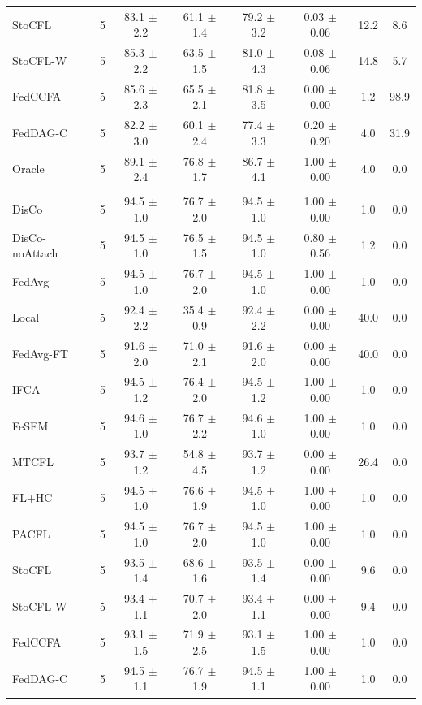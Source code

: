 {\begin{tabular}{l r c c c c c c}
StoCFL & 5 & 83.1 $\pm$ 2.2 & 61.1 $\pm$ 1.4 & 79.2 $\pm$ 3.2 & 0.03 $\pm$ 0.06 & 12.2 & 8.6 \\
StoCFL-W & 5 & 85.3 $\pm$ 2.2 & 63.5 $\pm$ 1.5 & 81.0 $\pm$ 4.3 & 0.08 $\pm$ 0.06 & 14.8 & 5.7 \\
FedCCFA & 5 & 85.6 $\pm$ 2.3 & 65.5 $\pm$ 2.1 & 81.8 $\pm$ 3.5 & 0.00 $\pm$ 0.00 & 1.2 & 98.9 \\
FedDAG-C & 5 & 82.2 $\pm$ 3.0 & 60.1 $\pm$ 2.4 & 77.4 $\pm$ 3.3 & 0.20 $\pm$ 0.20 & 4.0 & 31.9 \\
Oracle & 5 & 89.1 $\pm$ 2.4 & 76.8 $\pm$ 1.7 & 86.7 $\pm$ 4.1 & 1.00 $\pm$ 0.00 & 4.0 & 0.0 \\
\addlinespace
\multicolumn{8}{l}{\textit{Label skew only}} \\
DisCo & 5 & 94.5 $\pm$ 1.0 & 76.7 $\pm$ 2.0 & 94.5 $\pm$ 1.0 & 1.00 $\pm$ 0.00 & 1.0 & 0.0 \\
DisCo-noAttach & 5 & 94.5 $\pm$ 1.0 & 76.5 $\pm$ 1.5 & 94.5 $\pm$ 1.0 & 0.80 $\pm$ 0.56 & 1.2 & 0.0 \\
FedAvg & 5 & 94.5 $\pm$ 1.0 & 76.7 $\pm$ 2.0 & 94.5 $\pm$ 1.0 & 1.00 $\pm$ 0.00 & 1.0 & 0.0 \\
Local & 5 & 92.4 $\pm$ 2.2 & 35.4 $\pm$ 0.9 & 92.4 $\pm$ 2.2 & 0.00 $\pm$ 0.00 & 40.0 & 0.0 \\
FedAvg-FT & 5 & 91.6 $\pm$ 2.0 & 71.0 $\pm$ 2.1 & 91.6 $\pm$ 2.0 & 0.00 $\pm$ 0.00 & 40.0 & 0.0 \\
IFCA & 5 & 94.5 $\pm$ 1.2 & 76.4 $\pm$ 2.0 & 94.5 $\pm$ 1.2 & 1.00 $\pm$ 0.00 & 1.0 & 0.0 \\
FeSEM & 5 & 94.6 $\pm$ 1.0 & 76.7 $\pm$ 2.2 & 94.6 $\pm$ 1.0 & 1.00 $\pm$ 0.00 & 1.0 & 0.0 \\
MTCFL & 5 & 93.7 $\pm$ 1.2 & 54.8 $\pm$ 4.5 & 93.7 $\pm$ 1.2 & 0.00 $\pm$ 0.00 & 26.4 & 0.0 \\
FL+HC & 5 & 94.5 $\pm$ 1.0 & 76.6 $\pm$ 1.9 & 94.5 $\pm$ 1.0 & 1.00 $\pm$ 0.00 & 1.0 & 0.0 \\
PACFL & 5 & 94.5 $\pm$ 1.0 & 76.7 $\pm$ 2.0 & 94.5 $\pm$ 1.0 & 1.00 $\pm$ 0.00 & 1.0 & 0.0 \\
StoCFL & 5 & 93.5 $\pm$ 1.4 & 68.6 $\pm$ 1.6 & 93.5 $\pm$ 1.4 & 0.00 $\pm$ 0.00 & 9.6 & 0.0 \\
StoCFL-W & 5 & 93.4 $\pm$ 1.1 & 70.7 $\pm$ 2.0 & 93.4 $\pm$ 1.1 & 0.00 $\pm$ 0.00 & 9.4 & 0.0 \\
FedCCFA & 5 & 93.1 $\pm$ 1.5 & 71.9 $\pm$ 2.5 & 93.1 $\pm$ 1.5 & 1.00 $\pm$ 0.00 & 1.0 & 0.0 \\
FedDAG-C & 5 & 94.5 $\pm$ 1.1 & 76.7 $\pm$ 1.9 & 94.5 $\pm$ 1.1 & 1.00 $\pm$ 0.00 & 1.0 & 0.0 \\

\end{tabular}}
